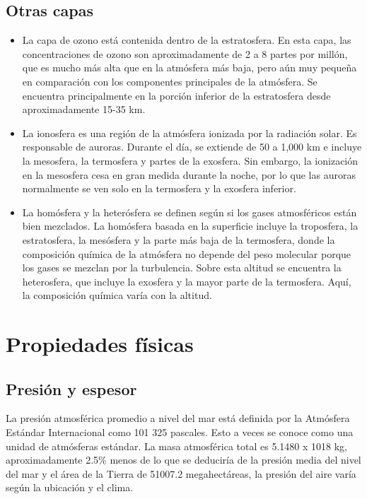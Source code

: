 \documentclass{article} %
\begin{document}
\subsection{Otras capas}

\begin{itemize}

\item La capa de ozono está contenida dentro de la estratosfera. En esta capa, las concentraciones de ozono son aproximadamente de 2 a 8 partes por millón, que es mucho más alta que en la atmósfera más baja, pero aún muy pequeña en comparación con los componentes principales de la atmósfera. Se encuentra principalmente en la porción inferior de la estratosfera desde aproximadamente 15-35 km. \\

\item La ionosfera es una región de la atmósfera ionizada por la radiación solar. Es responsable de auroras. Durante el día, se extiende de 50 a 1,000 km e incluye la mesosfera, la termosfera y partes de la exosfera. Sin embargo, la ionización en la mesosfera cesa en gran medida durante la noche, por lo que las auroras normalmente se ven solo en la termosfera y la exosfera inferior. \\

\item La homósfera y la heterósfera se definen según si los gases atmosféricos están bien mezclados. La homósfera basada en la superficie incluye la troposfera, la estratosfera, la mesósfera y la parte más baja de la termosfera, donde la composición química de la atmósfera no depende del peso molecular porque los gases se mezclan por la turbulencia. Sobre esta altitud se encuentra la heterosfera, que incluye la exosfera y la mayor parte de la termosfera. Aquí, la composición química varía con la altitud. \\

\end{itemize}

\section{Propiedades físicas}


\subsection{Presión y espesor}

La presión atmosférica promedio a nivel del mar está definida por la Atmósfera Estándar Internacional como 101 325 pascales. Esto a veces se conoce como una unidad de atmósferas estándar. La masa atmosférica total es 5.1480 x 1018 kg, aproximadamente 2.5\% menos de lo que se deduciría de la presión media del nivel del mar y el área de la Tierra de 51007.2 megahectáreas, la presión del aire varía según la ubicación y el clima.
\end{document}
